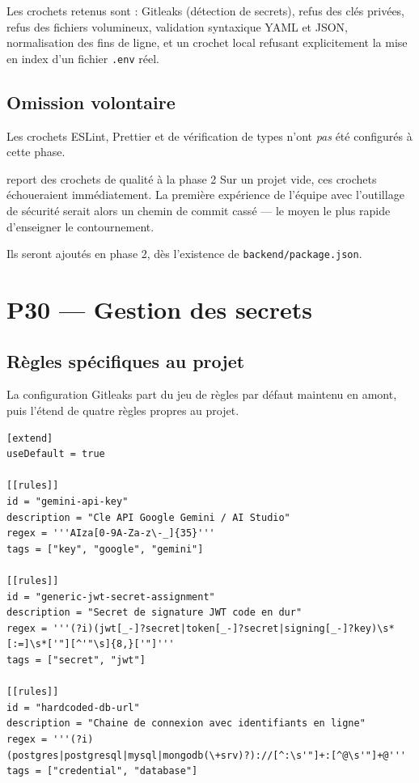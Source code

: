 Les crochets retenus sont : Gitleaks (détection de secrets), refus des clés
privées, refus des fichiers volumineux, validation syntaxique YAML et JSON,
normalisation des fins de ligne, et un crochet local refusant explicitement la
mise en index d'un fichier \texttt{.env} réel.

\subsection{Omission volontaire}

Les crochets ESLint, Prettier et de vérification de types n'ont
\emph{pas} été configurés à cette phase.

\begin{decision}{report des crochets de qualité à la phase 2}
Sur un projet vide, ces crochets échoueraient immédiatement. La première
expérience de l'équipe avec l'outillage de sécurité serait alors un chemin de
commit cassé --- le moyen le plus rapide d'enseigner le contournement.

Ils seront ajoutés en phase 2, dès l'existence de \texttt{backend/package.json}.
\end{decision}

\section{P30 --- Gestion des secrets}
\label{sec:secrets}

\subsection{Règles spécifiques au projet}

La configuration Gitleaks part du jeu de règles par défaut maintenu en amont,
puis l'étend de quatre règles propres au projet.

\begin{lstlisting}[caption={Extrait de \texttt{.gitleaks.toml} --- règles
spécifiques au projet}]
[extend]
useDefault = true

[[rules]]
id = "gemini-api-key"
description = "Cle API Google Gemini / AI Studio"
regex = '''AIza[0-9A-Za-z\-_]{35}'''
tags = ["key", "google", "gemini"]

[[rules]]
id = "generic-jwt-secret-assignment"
description = "Secret de signature JWT code en dur"
regex = '''(?i)(jwt[_-]?secret|token[_-]?secret|signing[_-]?key)\s*[:=]\s*['"][^'"\s]{8,}['"]'''
tags = ["secret", "jwt"]

[[rules]]
id = "hardcoded-db-url"
description = "Chaine de connexion avec identifiants en ligne"
regex = '''(?i)(postgres|postgresql|mysql|mongodb(\+srv)?)://[^:\s'"]+:[^@\s'"]+@'''
tags = ["credential", "database"]
\end{lstlisting}

